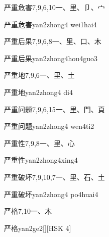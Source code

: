 \begin{Entry}{严重危害}{7,9,6,10}{⼀、⾥、⼙、⼧}
  \begin{Phonetics}{严重危害}{yan2zhong4 wei1hai4}
  \end{Phonetics}
\end{Entry}

\begin{Entry}{严重后果}{7,9,6,8}{⼀、⾥、⼝、⽊}
  \begin{Phonetics}{严重后果}{yan2zhong4hou4guo3}
  \end{Phonetics}
\end{Entry}

\begin{Entry}{严重地}{7,9,6}{⼀、⾥、⼟}
  \begin{Phonetics}{严重地}{yan2zhong4 di4}
  \end{Phonetics}
\end{Entry}

\begin{Entry}{严重问题}{7,9,6,15}{⼀、⾥、⾨、⾴}
  \begin{Phonetics}{严重问题}{yan2zhong4 wen4ti2}
  \end{Phonetics}
\end{Entry}

\begin{Entry}{严重性}{7,9,8}{⼀、⾥、⼼}
  \begin{Phonetics}{严重性}{yan2zhong4xing4}
  \end{Phonetics}
\end{Entry}

\begin{Entry}{严重破坏}{7,9,10,7}{⼀、⾥、⽯、⼟}
  \begin{Phonetics}{严重破坏}{yan2zhong4 po4huai4}
  \end{Phonetics}
\end{Entry}

\begin{Entry}{严格}{7,10}{⼀、⽊}
  \begin{Phonetics}{严格}{yan2ge2}[][HSK 4]
  \end{Phonetics}
\end{Entry}

